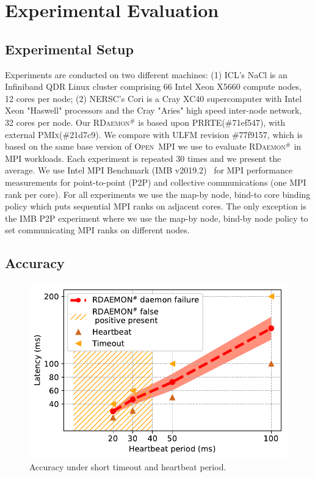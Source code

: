 \documentclass[sigconf]{acmart}
\newcommand{\prrte}[0]{\textsc{PRRTE}\xspace}
\newcommand{\pmix}[0]{\textsc{PMIx}\xspace}
\newcommand{\ompi}[0]{\textsc{Open~MPI}\xspace}
\newcommand{\ulfm}[0]{\textsc{ULFM}\xspace}
\newcommand{\mpi}[0]{\textsc{MPI}\xspace}
\newcommand{\ourwork}[0]{\textsc{RDaemon}\ensuremath{^\#}\xspace}
\newcommand{\imb}[0]{\textsc{IMB}\xspace}
\begin{document}
\section{Experimental Evaluation}\label{sec:experiments}

\subsection{Experimental Setup}
Experiments are conducted on two different machines: (1) ICL's NaCl is an Infiniband QDR Linux cluster comprising 66 Intel Xeon X5660 compute nodes, 12 cores per node; (2) NERSC's Cori
is a Cray XC40 supercomputer with Intel Xeon "Haswell" processors and the Cray "Aries" high speed inter-node network, 32 cores per node. Our \ourwork is based upon \prrte (\#71ef547), with external \pmix (\#21d7c9). We compare with \ulfm revision \#77f9157, which is based on the same base version of \ompi we use to evaluate \ourwork in MPI workloads. Each experiment is repeated 30 times and we present the average. We use Intel MPI Benchmark (\imb v2019.2)~\cite{IMB} for MPI performance measurements for point-to-point (P2P) and collective communications (one \mpi rank per core). For all experiments we use the map-by node, bind-to core binding policy which puts sequential MPI ranks on adjacent cores. The only exception is the \imb P2P experiment where we use
the map-by node, bind-by node policy to set communicating \mpi ranks on different nodes.

\subsection{Accuracy}
\begin{figure}[h]
  \centering
  \includegraphics[width=\linewidth]{accuracy.pdf}
  \caption{Accuracy under short timeout and heartbeat period.}
  \label{fig:accuracy}
\end{figure}
\end{document}
